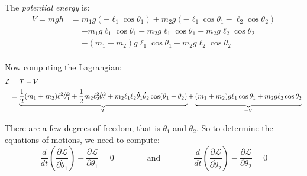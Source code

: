 \documentclass[letterpaper,8pt]{article}
\begin{document}
The \emph{potential energy} is:
\begin{align*}
V = mgh &= m_1 g (-\ell_1 \cos \theta_1) + m_2 g (-\ell_1 \cos \theta_1 - \ell_2 \cos \theta_2) \\
  &= -m_1 g \ell_1 \cos \theta_1 - m_2 g \ell_1 \cos \theta_1 - m_2 g \ell_2 \cos \theta_2 \\
  &= -(m_1 + m_2)g \ell_1 \cos \theta_1 - m_2 g \ell_2 \cos \theta_2 \\
\end{align*}

Now computing the Lagrangian:
\begin{align*}
\mathcal{L} &= T - V \\
   &= \underbrace{\frac{1}{2} (m_1 + m_2) \ell_1^2 \dot{\theta}_1^2 + \frac{1}{2} m_2 \ell_2^2 \dot{\theta}_2^2
          + m_2 \ell_1\ell_2 \dot{\theta}_1 \dot{\theta}_2 \cos (\theta_1 - \theta_2)}_T
      + \underbrace{\vphantom{\frac{1}{2}}(m_1 + m_2)g \ell_1 \cos \theta_1 + m_2 g \ell_2 \cos \theta_2}_{-V} \\
\end{align*}


There are a few degrees of freedom, that is $\theta_1$ and $\theta_2$.  So to determine the equations of motions, we need
to compute:
\[
\frac{d}{dt}\left( \frac{\partial\mathcal{L}}{\partial \dot{\theta}_1} \right) - 
\frac{\partial\mathcal{L}}{\partial \theta_1} = 0 
\qquad\qquad
\text{and}
\qquad\qquad
\frac{d}{dt}\left( \frac{\partial\mathcal{L}}{\partial \dot{\theta}_2} \right) - 
\frac{\partial\mathcal{L}}{\partial \theta_2} = 0 
\] 
\end{document}
